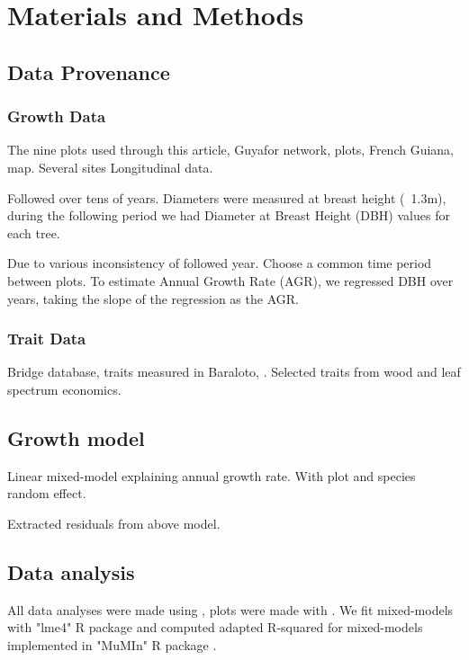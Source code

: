 \section*{Materials and Methods}
\label{sec:M&M}

\subsection*{Data Provenance}

\subsubsection*{Growth Data}
The nine plots used through this article,
Guyafor network, plots,
French Guiana, map. Several sites
Longitudinal data.

Followed over tens of years. Diameters were measured at breast height (~1.3m), during the following period we had Diameter at Breast Height (DBH) values for each tree.

Due to various inconsistency of followed year. Choose a common time period between plots. To estimate Annual Growth Rate (AGR), we regressed DBH over years, taking the slope of the regression as the AGR.

\subsubsection*{Trait Data}

Bridge database, traits measured in Baraloto, \citep{baraloto_functional_2010, baraloto_decoupled_2010}. Selected traits from wood and leaf spectrum economics.

\subsection*{Growth model}

Linear mixed-model explaining annual growth rate. With plot and species random effect.

Extracted residuals from above model.

\subsection*{Data analysis}

All data analyses were made using \citet{R_language}, plots were made with \citet{ggplot2_pkg}. We fit mixed-models with "lme4" R package \citep{lme4_pkg} and computed adapted R-squared for mixed-models \citep{nakagawa_general_2013} implemented in "MuMIn" R package \citep{mumin_pkg}.
